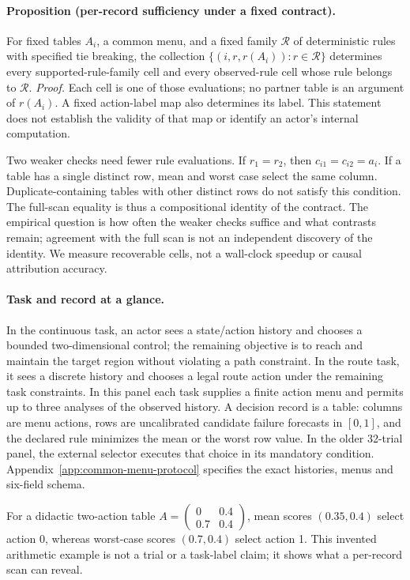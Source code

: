 \paragraph{Proposition (per-record sufficiency under a fixed contract).}
For fixed tables $A_i$, a common menu, and a fixed family $\mathcal R$ of
deterministic rules with specified tie breaking, the collection
$\{(i,r,r(A_i)):r\in\mathcal R\}$ determines every supported-rule-family
cell and every observed-rule cell whose rule belongs to $\mathcal R$.
\emph{Proof.} Each cell is one of those evaluations; no partner table is an
argument of $r(A_i)$. A fixed action-label map also determines its label.
This statement does not establish the validity of that map or identify
an actor's internal computation.

Two weaker checks need fewer rule evaluations. If $r_1=r_2$, then
$c_{i1}=c_{i2}=a_i$. If a table has a single distinct row, mean and worst case
select the same column. Duplicate-containing tables with other distinct
rows do not satisfy this condition. The full-scan equality is thus a
compositional identity of the contract. The
empirical question is how often the weaker checks suffice and what contrasts
remain; agreement with the full scan is not an independent discovery of the
identity. We measure recoverable cells, not a wall-clock speedup or causal
attribution accuracy.

\paragraph{Task and record at a glance.}
In the continuous task, an actor sees a state/action history and chooses a
bounded two-dimensional control; the remaining objective is to reach and
maintain the target region without violating a path constraint. In the route
task, it sees a discrete history and chooses a legal route action under the
remaining task constraints. In this panel each task supplies a finite action
menu and permits up to three analyses of the observed history. A decision
record is a table: columns are menu actions, rows are uncalibrated candidate
failure forecasts in $[0,1]$, and the declared rule minimizes the mean or
the worst row value. In the older 32-trial panel, the external selector executes
that choice in its mandatory condition. Appendix~\ref{app:common-menu-protocol} specifies the
exact histories, menus and six-field schema.

For a didactic two-action table
$A=\left(\begin{smallmatrix}0&0.4\\0.7&0.4\end{smallmatrix}\right)$,
mean scores $(0.35,0.4)$ select action 0, whereas worst-case scores
$(0.7,0.4)$ select action 1. This invented arithmetic example is not a trial
or a task-label claim; it shows what a per-record scan can reveal.

